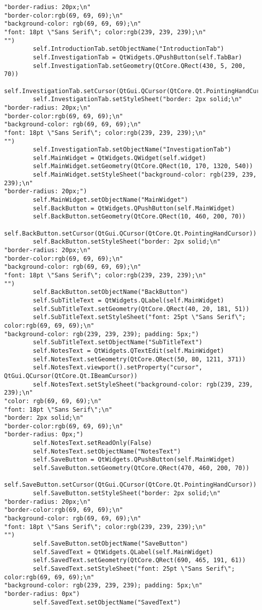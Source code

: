 \documentclass{article}
\begin{document}
\begin{lstlisting}
"border-radius: 20px;\n"
"border-color:rgb(69, 69, 69);\n"
"background-color: rgb(69, 69, 69);\n"
"font: 18pt \"Sans Serif\"; color:rgb(239, 239, 239);\n"
"")
        self.IntroductionTab.setObjectName("IntroductionTab")
        self.InvestigationTab = QtWidgets.QPushButton(self.TabBar)
        self.InvestigationTab.setGeometry(QtCore.QRect(430, 5, 200, 70))
        self.InvestigationTab.setCursor(QtGui.QCursor(QtCore.Qt.PointingHandCursor))
        self.InvestigationTab.setStyleSheet("border: 2px solid;\n"
"border-radius: 20px;\n"
"border-color:rgb(69, 69, 69);\n"
"background-color: rgb(69, 69, 69);\n"
"font: 18pt \"Sans Serif\"; color:rgb(239, 239, 239);\n"
"")
        self.InvestigationTab.setObjectName("InvestigationTab")
        self.MainWidget = QtWidgets.QWidget(self.widget)
        self.MainWidget.setGeometry(QtCore.QRect(10, 170, 1320, 540))
        self.MainWidget.setStyleSheet("background-color: rgb(239, 239, 239);\n"
"border-radius: 20px;")
        self.MainWidget.setObjectName("MainWidget")
        self.BackButton = QtWidgets.QPushButton(self.MainWidget)
        self.BackButton.setGeometry(QtCore.QRect(10, 460, 200, 70))
        self.BackButton.setCursor(QtGui.QCursor(QtCore.Qt.PointingHandCursor))
        self.BackButton.setStyleSheet("border: 2px solid;\n"
"border-radius: 20px;\n"
"border-color:rgb(69, 69, 69);\n"
"background-color: rgb(69, 69, 69);\n"
"font: 18pt \"Sans Serif\"; color:rgb(239, 239, 239);\n"
"")
        self.BackButton.setObjectName("BackButton")
        self.SubTitleText = QtWidgets.QLabel(self.MainWidget)
        self.SubTitleText.setGeometry(QtCore.QRect(40, 20, 181, 51))
        self.SubTitleText.setStyleSheet("font: 25pt \"Sans Serif\"; color:rgb(69, 69, 69);\n"
"background-color: rgb(239, 239, 239); padding: 5px;")
        self.SubTitleText.setObjectName("SubTitleText")
        self.NotesText = QtWidgets.QTextEdit(self.MainWidget)
        self.NotesText.setGeometry(QtCore.QRect(50, 80, 1211, 371))
        self.NotesText.viewport().setProperty("cursor", QtGui.QCursor(QtCore.Qt.IBeamCursor))
        self.NotesText.setStyleSheet("background-color: rgb(239, 239, 239);\n"
"color: rgb(69, 69, 69);\n"
"font: 18pt \"Sans Serif\";\n"
"border: 2px solid;\n"
"border-color:rgb(69, 69, 69);\n"
"border-radius: 0px;")
        self.NotesText.setReadOnly(False)
        self.NotesText.setObjectName("NotesText")
        self.SaveButton = QtWidgets.QPushButton(self.MainWidget)
        self.SaveButton.setGeometry(QtCore.QRect(470, 460, 200, 70))
        self.SaveButton.setCursor(QtGui.QCursor(QtCore.Qt.PointingHandCursor))
        self.SaveButton.setStyleSheet("border: 2px solid;\n"
"border-radius: 20px;\n"
"border-color:rgb(69, 69, 69);\n"
"background-color: rgb(69, 69, 69);\n"
"font: 18pt \"Sans Serif\"; color:rgb(239, 239, 239);\n"
"")
        self.SaveButton.setObjectName("SaveButton")
        self.SavedText = QtWidgets.QLabel(self.MainWidget)
        self.SavedText.setGeometry(QtCore.QRect(690, 465, 191, 61))
        self.SavedText.setStyleSheet("font: 25pt \"Sans Serif\"; color:rgb(69, 69, 69);\n"
"background-color: rgb(239, 239, 239); padding: 5px;\n"
"border-radius: 0px")
        self.SavedText.setObjectName("SavedText")


\end{lstlisting}
\end{document}
